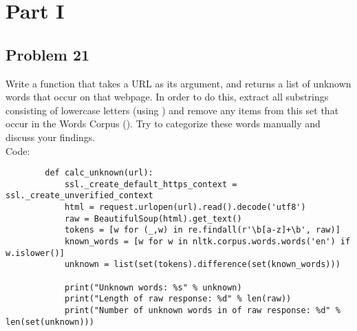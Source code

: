 \documentclass[12pt]{article}
\begin{document}
	\section*{Part I}
		\subsection*{Problem 21}
		Write a function  that takes a URL as its argument, and returns a list of unknown words that occur on that webpage. In order to do this, extract all substrings consisting of lowercase letters (using ) and remove any items from this set that occur in the Words Corpus (). Try to categorize these words manually and discuss your findings.\\
		
		Code:
		\begin{lstlisting}
		def calc_unknown(url):
			ssl._create_default_https_context = ssl._create_unverified_context
			html = request.urlopen(url).read().decode('utf8')
			raw = BeautifulSoup(html).get_text()
			tokens = [w for (_,w) in re.findall(r'\b[a-z]+\b', raw)]
			known_words = [w for w in nltk.corpus.words.words('en') if w.islower()]
			unknown = list(set(tokens).difference(set(known_words)))
			
			print("Unknown words: %s" % unknown)
			print("Length of raw response: %d" % len(raw))
			print("Number of unknown words in of raw response: %d" % len(set(unknown)))
		\end{lstlisting}
		
\end{document}
